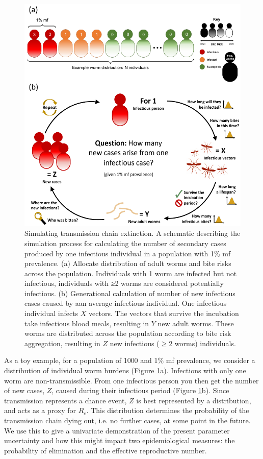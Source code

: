 \begin{figure}
    \centering
    \includegraphics{Project/Figures/LFElimination/Figure2.pdf}
    \caption[Transmission chain extinction simulation schematic.]{Simulating transmission chain extinction. A schematic describing the simulation process for calculating the number of secondary cases produced by one infectious individual in a population with 1\% mf prevalence. (a) Allocate distribution of adult worms and bite risks across the population. Individuals with 1 worm are infected but not infectious, individuals with ≥2 worms are considered potentially infectious. (b) Generational calculation of number of new infectious cases caused by aan average infectious individual. One infectious individual infects $X$ vectors. The vectors that survive the incubation take infectious blood meals, resulting in $Y$ new adult worms. These worms are distributed across the population according to bite risk aggregation, resulting in $Z$ new infectious ($\geq$2 worms) individuals.}
    \label{fig:Elim_2}
\end{figure}

As a toy example, for a population of 1000 and 1\% mf prevalence, we consider a distribution of individual worm burdens (Figure \ref{fig:Elim_2}a). Infections with only one worm are non-transmissible. From one infectious person you then get the number of new cases, $Z$, caused during their infectious period (Figure \ref{fig:Elim_2}b). Since transmission represents a chance event, $Z$ is best represented by a distribution, and acts as a proxy for $R_e$. This distribution determines the probability of the transmission chain dying out, i.e. no further cases, at some point in the future. We use this to give a univariate demonstration of the present parameter uncertainty and how this might impact two epidemiological measures: the probability of elimination and the effective reproductive number.

